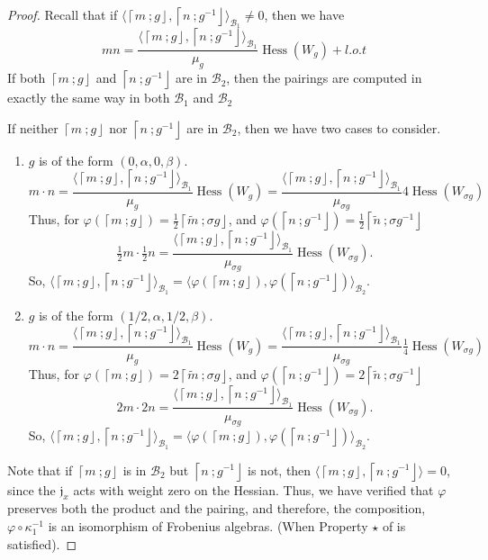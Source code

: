 \documentclass[10pt, letterpaper]{amsart}
\theoremstyle{remark}
\newcommand{\sB}{\mathscr{B}}
\newcommand{\fjrw}[2]{ \left\lceil #1 \:; #2 \right\rfloor }
\newcommand{\jw}{\mathfrak{j}}
\DeclareMathOperator{\Hess}{Hess}
\begin{document}
\begin{proof}
Recall that if $\langle \fjrw{m}{g}, \fjrw{n}{g^{-1}}\rangle_{\sB_1} \neq 0$, then we have 
\[
mn = \frac{\langle \fjrw{m}{g}, \fjrw{n}{g^{-1}}\rangle_{\sB_1}}{\mu_g}\Hess(W_g) + l.o.t
\]
 If both $\fjrw{m}{g}$ and  $\fjrw{n}{g^{-1}}$ are in $\sB_2$, then the pairings are computed in exactly the same way in both $\sB_1$ and $\sB_2$ 

If neither $\fjrw{m}{g}$ nor $\fjrw{n}{g^{-1}}$ are in $\sB_2$, then we have two cases to consider. 
\begin{enumerate}
\item $g$ is of the form $(0, \alpha, 0, \beta)$. \\
\[
m \cdot n = \frac{\langle \fjrw{m}{g}, \fjrw{n}{g^{-1}} \rangle_{\sB_1}}{\mu_g} \Hess(W_g)  = \frac{\langle \fjrw{m}{g}, \fjrw{n}{g^{-1}} \rangle_{\sB_1}}{\mu_{\sigma g}} 4 \Hess(W_{\sigma g}) 
\]
Thus, for $\varphi(\fjrw{m}{g}) = \tfrac 12 \fjrw{\tilde m}{\sigma g}$, and  $\varphi(\fjrw{n}{g^{-1}}) = \tfrac 12 \fjrw{\tilde n}{\sigma g^{-1}}$
\[
 \tfrac 12 m \cdot \tfrac 12 n   = \frac{\langle \fjrw{m}{g}, \fjrw{n}{g^{-1}} \rangle_{\sB_1}}{\mu_{\sigma g}}  \Hess(W_{\sigma g}). 
\]
So, $ \langle \fjrw{m}{g}, \fjrw{n}{g^{-1}} \rangle_{\sB_1} = \langle \varphi(\fjrw{m}{g}), \varphi(\fjrw{n}{g^{-1}}) \rangle_{\sB_2}$.

\item $g$ is of the form $(1/2, \alpha, 1/2, \beta)$. \\
\[
m \cdot n = \frac{\langle \fjrw{m}{g}, \fjrw{n}{g^{-1}} \rangle_{\sB_1}}{\mu_g} \Hess(W_g)  = \frac{\langle \fjrw{m}{g}, \fjrw{n}{g^{-1}} \rangle_{\sB_1}}{\mu_{\sigma g}} \tfrac 14 \Hess(W_{\sigma g}) 
\]
Thus, for $\varphi(\fjrw{m}{g}) = 2\fjrw{\tilde m}{\sigma g}$, and  $\varphi(\fjrw{n}{g^{-1}}) = 2\fjrw{\tilde n}{\sigma g^{-1}}$
\[
2m \cdot 2n   = \frac{\langle \fjrw{m}{g}, \fjrw{n}{g^{-1}} \rangle_{\sB_1}}{\mu_{\sigma g}}  \Hess(W_{\sigma g}). 
\]
So, $ \langle \fjrw{m}{g}, \fjrw{n}{g^{-1}} \rangle_{\sB_1} = \langle \varphi(\fjrw{m}{g}), \varphi(\fjrw{n}{g^{-1}}) \rangle_{\sB_2}$.
\end{enumerate}

Note that if $\fjrw{m}{g}$ is in $\sB_2$ but  $\fjrw{n}{g^{-1}}$ is not, then $\langle\fjrw{m}{g},\fjrw{n}{g^{-1}}\rangle=0$, since the $\jw_x$ acts with weight zero on the Hessian. Thus, we have verified that $\varphi$ preserves both the product and the pairing, and therefore, the composition, $\varphi \circ \kappa_1^{-1}$ is an isomorphism of Frobenius algebras. (When Property $\star$ of \cite{FJJS} is satisfied). 

\end{proof}
\end{document}
